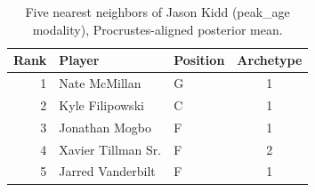 \begin{table}[htbp]
  \centering\small
  \begin{tabular}{rllc}
    \toprule
    Rank & Player & Position & Archetype \\
    \midrule
    1 & Nate McMillan & G & 1 \\
    2 & Kyle Filipowski & C & 1 \\
    3 & Jonathan Mogbo & F & 1 \\
    4 & Xavier Tillman Sr. & F & 2 \\
    5 & Jarred Vanderbilt & F & 1 \\
    \bottomrule
  \end{tabular}
  \caption{Five nearest neighbors of Jason Kidd (peak_age modality), Procrustes-aligned posterior mean.}
  \label{tab:Jason_Kidd_neighbors_peak_age}
\end{table}

